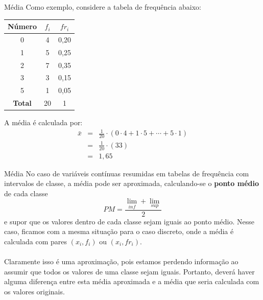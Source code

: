 \documentclass[10pt]{beamer}\usepackage[]{graphicx}\usepackage[]{color}
\theoremstyle{definition}
\begin{document}
\begin{frame}{Média}
  Como exemplo, considere a tabela de frequência abaixo:
  \begin{table}[h]
    \centering
    \begin{tabular}{ccc}
      \hline
      \textbf{Número} & \textbf{$f_i$} & \textbf{$fr_i$} \\
      \hline
      0 & 4 & 0,20 \\
      1 & 5 & 0,25 \\
      2 & 7 & 0,35 \\
      3 & 3 & 0,15 \\
      5 & 1 & 0,05 \\
      \hline
      \textbf{Total} & 20 & 1 \\
      \hline
    \end{tabular}
  \end{table}
  A média é calculada por:
  \begin{eqnarray*}
    \bar{x} &=& \frac{1}{20} \cdot (0 \cdot 4 + 1 \cdot 5 + \cdots + 5 \cdot 1)\\
            &=& \frac{1}{20} \cdot (33)\\
            &=& 1,65
  \end{eqnarray*}
\end{frame}

\begin{frame}{Média}
  No caso de variáveis contínuas resumidas em tabelas de frequência com
  intervalos de classe, a média pode ser aproximada, calculando-se o
  \textbf{ponto médio} de cada classe
  \begin{equation*}
    PM = \frac{\lim_{inf} + \lim_{sup}}{2}
  \end{equation*}
  e supor que os valores dentro de cada classe sejam iguais ao ponto
  médio. Nesse caso, ficamos com a mesma situação para o caso discreto,
  onde a média é calculada com pares $(x_i, f_i)$ ou $(x_i, fr_i)$. \\~\\

  Claramente isso é uma aproximação, pois estamos perdendo informação ao
  assumir que todos os valores de uma classe sejam iguais. Portanto,
  deverá haver alguma diferença entre esta média aproximada e a média
  que seria calculada com os valores originais.
\end{frame}
\end{document}
